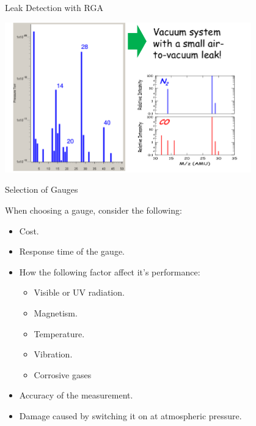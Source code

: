 \documentclass[11pt]{beamer}
\begin{document}
\begin{frame}{Leak Detection with RGA}

\begin{block}{} 

		\begin{center}
			\includegraphics[width=0.8\textwidth]{RealLeak.png}
		\end{center} 	



\end {block}

\end{frame}


\begin{frame}{Selection of Gauges}

When choosing a gauge, consider the following: 
 \begin{itemize}
          \item Cost.
          \item Response time of the gauge.
          \item How the following factor affect it’s performance:
               \begin{itemize}
                 \item Visible or UV radiation.
         		  \item Magnetism.
         		  \item Temperature.
         		  \item Vibration.
         		  \item Corrosive gases
        		\end{itemize}
          \item Accuracy of the measurement. 
          \item Damage caused by switching it on at atmospheric pressure.
        \end{itemize}





\end{frame}
\end{document}
